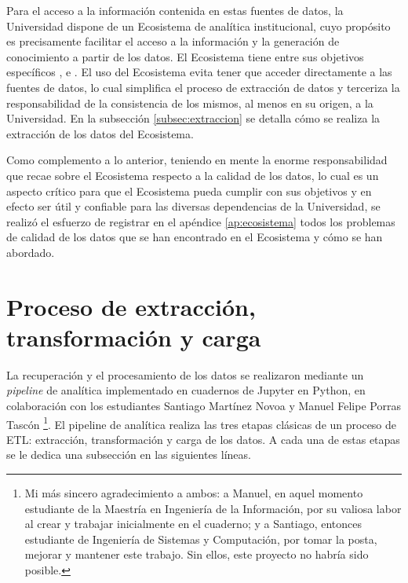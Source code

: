 Para el acceso a la información contenida en estas fuentes de datos, la Universidad dispone de un Ecosistema de analítica institucional, cuyo propósito es precisamente facilitar el acceso a la información y la generación de conocimiento a partir de los datos. El Ecosistema tiene entre sus objetivos específicos ,  e  \cite{ecosistema}. El uso del Ecosistema evita tener que acceder directamente a las fuentes de datos, lo cual simplifica el proceso de extracción de datos y terceriza la responsabilidad de la consistencia de los mismos, al menos en su origen, a la Universidad. En la subsección \ref{subsec:extraccion} se detalla cómo se realiza la extracción de los datos del Ecosistema.

Como complemento a lo anterior, teniendo en mente la enorme responsabilidad que recae sobre el Ecosistema respecto a la calidad de los datos, lo cual es un aspecto crítico para que el Ecosistema pueda cumplir con sus objetivos y en efecto ser útil y confiable para las diversas dependencias de la Universidad, se realizó el esfuerzo de registrar en el apéndice \ref{ap:ecosistema} todos los problemas de calidad de los datos que se han encontrado en el Ecosistema y cómo se han abordado.

\section{Proceso de extracción, transformación y carga}

La recuperación y el procesamiento de los datos se realizaron mediante un \textit{\gls{pipeline}} de analítica implementado en cuadernos de \gls{Jupyter} en \gls{Python}, en colaboración con los estudiantes Santiago Martínez Novoa y Manuel Felipe Porras Tascón
\footnote{Mi más sincero agradecimiento a ambos: a Manuel, en aquel momento estudiante de la Maestría en Ingeniería de la Información, por su valiosa labor al crear y trabajar inicialmente en el cuaderno; y a Santiago, entonces estudiante de Ingeniería de Sistemas y Computación, por tomar la posta, mejorar y mantener este trabajo. Sin ellos, este proyecto no habría sido posible.}.
El pipeline de analítica realiza las tres etapas clásicas de un proceso de \gls{ETL}: extracción, transformación y carga de los datos. A cada una de estas etapas se le dedica una subsección en las siguientes líneas.


